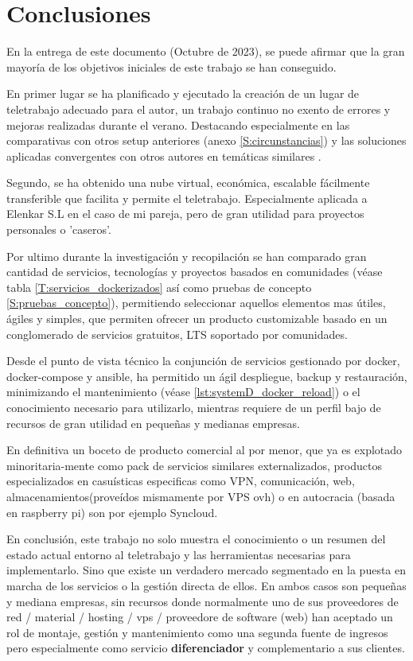 \cleardoublepage
{}
\chapter{Conclusiones}
En la entrega de este documento (Octubre de 2023), se puede afirmar que la gran mayoría de los objetivos iniciales de este trabajo se han conseguido.

En primer lugar se ha planificado y ejecutado la creación de un lugar de teletrabajo adecuado para el autor, un trabajo continuo no exento de errores y mejoras realizadas durante el verano. Destacando especialmente en las comparativas con otros setup anteriores (anexo \ref{S:circunstancias}) y las soluciones aplicadas convergentes  con otros autores en temáticas similares \cite{c_overemployed}.

Segundo, se ha obtenido una nube virtual, económica, escalable fácilmente transferible que facilita y permite el teletrabajo. Especialmente aplicada a Elenkar S.L en el caso de mi pareja, pero de gran utilidad para proyectos personales o 'caseros'.

Por ultimo durante la investigación y recopilación se han comparado gran cantidad de servicios, tecnologías y proyectos basados en comunidades (véase tabla \ref{T:servicios_dockerizados} así como pruebas de concepto \ref{S:pruebas_concepto}), permitiendo seleccionar aquellos elementos mas útiles, ágiles y simples, que permiten ofrecer un producto customizable basado en un conglomerado de servicios gratuitos, LTS soportado por comunidades. 

Desde el punto de vista técnico la conjunción de servicios gestionado por docker, docker-compose y ansible, ha permitido un ágil despliegue, backup y restauración, minimizando el mantenimiento (véase \ref{lst:systemD_docker_reload}) o el conocimiento necesario para utilizarlo, mientras requiere de un perfil bajo de recursos de gran utilidad en pequeñas y medianas empresas.

En definitiva un boceto de producto comercial al por menor, que ya es explotado minoritaria-mente como pack de servicios similares externalizados\cite{c_tomahost}, productos especializados en casuísticas especificas como VPN\cite{c_procustodibus}, comunicación, web, almacenamientos(proveídos mismamente por VPS ovh\cite{c_vps_ovh}) o en autocracia (basada en raspberry pi) son por ejemplo Syncloud\cite{c_syncloud}.

En conclusión, este trabajo no solo muestra el conocimiento o un resumen del estado actual entorno al teletrabajo y las herramientas necesarias para implementarlo. Sino que existe un verdadero mercado segmentado en la puesta en marcha de los servicios o la gestión directa de ellos. En ambos casos son pequeñas y mediana empresas, sin recursos donde normalmente uno de sus proveedores de red / material / hosting / vps / proveedore de software (web) han aceptado un rol de montaje, gestión y mantenimiento como una segunda fuente de ingresos pero especialmente como servicio \textbf{diferenciador} y complementario a sus clientes.

